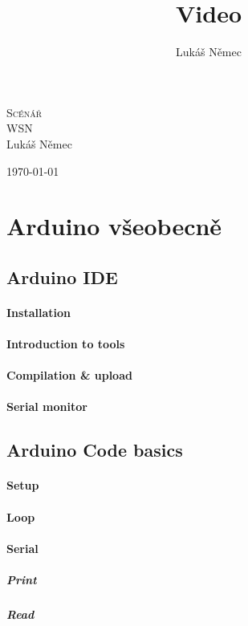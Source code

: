 \documentclass[12pt,titlepage]{article}
\title{Video}
\author{Lukáš Němec}
\begin{document}
\begin{titlepage}
\begin{center}
\textsc{\LARGE Scénář}\\[1cm]
\textsc{\Large WSN}\\[0.6cm]


\Large{Lukáš Němec}\\[1cm]

\bigskip
\bigskip

\Large{\today}
\end{center}
\end{titlepage}



\tableofcontents
\newpage


\section{Arduino všeobecně}

	\subsection{Arduino IDE}
		\paragraph{Installation}
		\paragraph{Introduction to tools}
		\paragraph{Compilation \& upload}
		\paragraph{Serial monitor}

	\subsection{Arduino Code basics}
		\paragraph{Setup}
		\paragraph{Loop}
		\paragraph{Serial}
			\subparagraph{Print}
			\subparagraph{Read}
		
\end{document}

